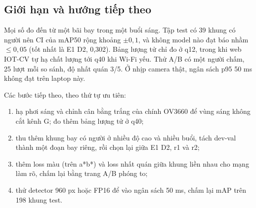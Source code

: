 \subsection{Giới hạn và hướng tiếp theo}

Mọi số đo đến từ một bãi bay trong một buổi sáng. Tập test có 39 khung có người nên CI của mAP50 rộng khoảng $\pm0{,}1$, và không model nào đạt báo nhầm $\leq0{,}05$ (tốt nhất là E1 D2, 0,302). Bảng lượng tử chỉ đo ở q12, trong khi web IOT-CV tự hạ chất lượng tới q40 khi Wi-Fi yếu. Thử A/B có một người chấm, 25 lượt mỗi so sánh, độ nhất quán 3/5. Ở nhịp camera thật, ngân sách p95 50 ms không đạt trên laptop này.

Các bước tiếp theo, theo thứ tự ưu tiên:
\begin{enumerate}
\item hạ phơi sáng và chỉnh cân bằng trắng của chính OV3660 để vùng sáng không cắt kênh G; đo thêm bảng lượng tử ở q40;
\item thu thêm khung bay có người ở nhiều độ cao và nhiều buổi, tách dev-val thành một đoạn bay riêng, rồi chọn lại giữa E1 D2, r1 và r2;
\item thêm loss màu (trên a*b*) và loss nhất quán giữa khung liền nhau cho mạng làm rõ, chấm lại bằng trang A/B phóng to;
\item thử detector 960 px hoặc FP16 để vào ngân sách 50 ms, chấm lại mAP trên 198 khung test.
\end{enumerate}

